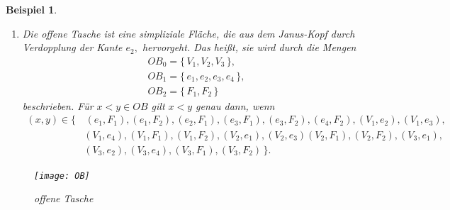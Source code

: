 \documentclass[12pt,titlepage,twoside,cleardoublepage]{article}
\theoremstyle{nummermitklammern}
\newtheorem{bsp}[temp]{Beispiel}
\newtheorem{bsp}[zahl]{Beispiel}
\numberwithin{equation}{section}
\begin{document}
\begin{bsp}
\begin{enumerate}
 \begin{align*}
 &J_{0}=\{\,V_{1},V_{2},V_{3}\,\} ,\\
 &J_{1}=\{\,e_{1},e_{2},e_{3}\,\},\\
 &J_{2}=\{\, F_{1},F_{2}\,\}
\end{align*}
definiert. Für $x,y\in J$ gilt $x<y$ genau dann, wenn
\begin{align*} 
 (x,y)\in\{&\,(e_{1},F_{1}),(e_{1},F_{2}),(e_{2},F_{1}),(e_{2},F_{2}),(e_{3},F_{1}),(e_{3},F_{2}),(V_{1},e_{2}),(V_{1},e_{3}),\\ &(V_{1},F_{1}),
  (V_{1},F_{2}),(V_{2},e_{1}),(V_{2},e_{3}),(V_{2},F_{1})
 (V_{2},F_{2}), (V_{3},e_{1}), (V_{3},e_{2}),\\&(V_{3},F_{1}),(V_{3},F_{2}) \,\}.
 \end{align*}

\begin{figure}[H]
\begin{center}
\texttt{[image: JanusHead]}
\end{center}
\caption{Janus-Kopf}
\end{figure}
 \item 
 Die \emph{offene Tasche} ist eine simpliziale Fläche, die aus dem \emph{Janus-Kopf} durch Verdopplung der Kante $e_{2},$ hervorgeht. Das heißt, sie wird durch die Mengen
 \begin{align*}
&  OB_{0}=\{\,V_{1},V_{2},V_{3}\,\},\\
 & OB_{1}=\{\,e_{1},e_{2},e_{3},e_{4} \,\},\\
  &OB_{2}=\{\,F_{1},F_{2}\,\}
  \end{align*}
  beschrieben. Für  $x<y\in OB$ gilt $x<y$ genau dann, wenn \begin{align*}
 (x,y)\in\{&\,(e_{1},F_{1}),(e_{1},F_{2}),(e_{2},F_{1}),(e_{3},F_{1}),(e_{3},F_{2}),(e_{4},F_{2}),(V_{1},e_{2}),(V_{1},e_{3}),\\ &(V_{1},e_{4}),
  (V_{1},F_{1}),(V_{1},F_{2}),(V_{2},e_{1}),(V_{2},e_{3})
 (V_{2},F_{1}), (V_{2},F_{2}), (V_{3},e_{1}),\\&(V_{3},e_{2}),(V_{3},e_{4}),(V_{3},F_{1}),(V_3,F_2) \,\}.
 \end{align*}
 \end{enumerate}
\begin{figure}[H]
\begin{center}
\texttt{[image: OB]}
\end{center}
\caption{offene Tasche}
\end{figure}
\end{bsp}
\end{document}
